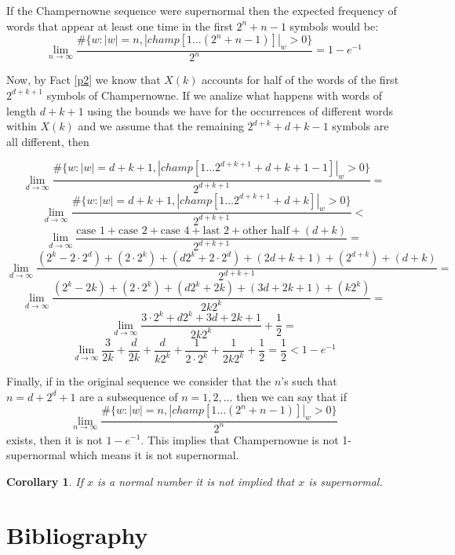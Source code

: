 \documentclass[11pt,a4paper,twoside]{tesis}
\newtheorem{corollary}{Corollary}[theorem]
\theoremstyle{definition}
\begin{document}
If the Champernowne sequence were supernormal then the expected frequency of words that appear at least one time in the first $2^n + n -1$ symbols would be:
$$\lim_{n\to\infty} \frac{\#\{w: |w| = n  , |champ[1...(2^n+n-1)]|_w > 0\}}{2^n}  = 1 - e^{-1}$$


Now, by Fact \ref{p2} we know that $X(k)$ accounts for half of the words of the first $2^{d+k+1}$ symbols of Champernowne. 
If we analize what happens with words of length $d+k+1$ using the bounds we have for the occurrences of different words within $X(k)$ and we assume that the remaining $2^{d+k} + d + k - 1$  symbols are all different, then



$$\lim_{d\to\infty} \frac{\#\{w : |w| = d+k+1, |champ[1 \dots 2^{d+k+1}+d+k+1-1]|_w > 0 \}}{2^{d+k+1}} =$$
$$\lim_{d\to\infty} \frac{\#\{w : |w| = d+k+1, |champ[1 \dots 2^{d+k+1}+d+k]|_w > 0 \}}{2^{d+k+1}} <$$
$$\lim_{d\to\infty} \frac{ \textrm{case 1} + \textrm{case 2}+ \textrm{case 4} + \textrm{last 2} + \textrm{other half} + (d + k) }{2^{d+k+1}} =$$
$$\lim_{d\to\infty} \frac{(2^k - 2\cdot 2^d) + (2 \cdot 2^k)+ (d2^k + 2 \cdot 2^d) + (2d+k+1) + (2^{d+k}) + (d + k) }{2^{d+k+1}} =$$
$$\lim_{d\to\infty} \frac{(2^k - 2k) + (2 \cdot 2^k)+ (d2^k + 2k) + (3d+2k+1) + (k2^{k})}{2k2^{k}} =$$
$$\lim_{d\to\infty} \frac{3\cdot2^k + d2^k  + 3d+2k+1}{2k2^{k}} + \frac{1}{2} =$$
$$\lim_{d\to\infty} \frac{3}{2k} + \frac{d}{2k} + \frac{d}{k2^{k}} + \frac{1}{2\cdot2^{k}} + \frac{1}{2k2^{k}} + \frac{1}{2} = \frac{1}{2} < 1 - e^{-1}$$


Finally, if in the original sequence we consider that the $n$'s such that $n = d + 2^d + 1$ are a subsequence of $n=1,2,\dots$ then we can say that if
$$\lim_{n\to\infty} \frac{\#\{w: |w| = n  , |champ[1...(2^n+n-1)]|_w > 0\}}{2^n}$$
exists, then it is not $1 - e^{-1}$.
This implies that Champernowne is not 1-supernormal which means it is not supernormal.

\begin{corollary}
If $x$ is a normal number it is not implied that $x$ is supernormal.
\end{corollary}



\chapter{Bibliography}
\backmatter


\end{document}
